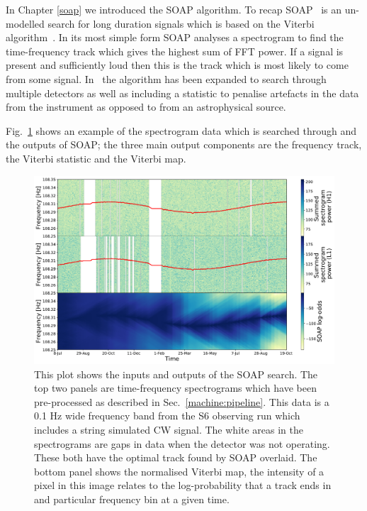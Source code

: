%
In Chapter \ref{soap} we introduced the SOAP algorithm. 
To recap SOAP~\cite{bayley2019SOAPGeneralised} is an un-modelled search for long
duration signals which is based on the Viterbi
algorithm~\cite{viterbi1967ErrorBounds}. In its most simple form SOAP
analyses a spectrogram to find the time-frequency track which gives the highest
sum of \gls{FFT} power. If a signal is present and sufficiently loud then this
is the track which is most likely to come from some signal.
In~\cite{bayley2019SOAPGeneralised} the algorithm has been expanded to
search through multiple detectors as well as including a statistic to penalise
artefacts in the data from the instrument as opposed to from an astrophysical
source. 

%
Fig.~\ref{soap:viterbiplot} shows an example of the spectrogram data which is
searched through and the outputs of SOAP; the three main output components are
the frequency track, the Viterbi statistic and the Viterbi map.

\begin{figure}[ht]
	\includegraphics[scale=0.43]{C4_cnn/two_vit_example.pdf}
	\caption[Example SOAP output from H1 and L1 input spectrograms. ]{\label{soap:viterbiplot} This plot shows the inputs and outputs of the
		SOAP search. The top two panels are time-frequency spectrograms which have been pre-processed as described in Sec.~\ref{machine:pipeline}. This
		data is a 0.1 Hz wide frequency band from the S6 observing run \cite{}  which includes a string simulated \gls{CW} signal. The white areas in the spectrograms are gaps in data when the detector was not operating. These both have the
		optimal track found by SOAP overlaid. The bottom panel shows the normalised Viterbi map, the intensity of a
		pixel in this image relates to the log-probability that a track ends in and
		particular frequency bin at a given time.}
\end{figure}

